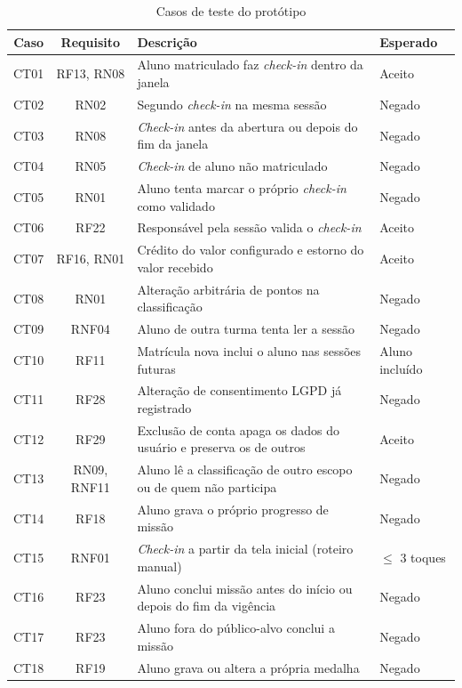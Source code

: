 \begin{table}[H]
  \centering
  \caption{Casos de teste do protótipo}
  \label{tab:testes}
  \footnotesize
  \begin{tabular}{ccp{6.0cm}p{3.2cm}}
    \toprule
    \textbf{Caso} & \textbf{Requisito} & \textbf{Descrição} & \textbf{Esperado} \\
    \midrule
    CT01 & RF13, RN08 & Aluno matriculado faz \textit{check-in} dentro da janela & Aceito \\
    CT02 & RN02 & Segundo \textit{check-in} na mesma sessão & Negado \\
    CT03 & RN08 & \textit{Check-in} antes da abertura ou depois do fim da janela & Negado \\
    CT04 & RN05 & \textit{Check-in} de aluno não matriculado & Negado \\
    CT05 & RN01 & Aluno tenta marcar o próprio \textit{check-in} como validado & Negado \\
    CT06 & RF22 & Responsável pela sessão valida o \textit{check-in} & Aceito \\
    CT07 & RF16, RN01 & Crédito do valor configurado e estorno do valor recebido & Aceito \\
    CT08 & RN01 & Alteração arbitrária de pontos na classificação & Negado \\
    CT09 & RNF04 & Aluno de outra turma tenta ler a sessão & Negado \\
    CT10 & RF11 & Matrícula nova inclui o aluno nas sessões futuras & Aluno incluído \\
    CT11 & RF28 & Alteração de consentimento LGPD já registrado & Negado \\
    CT12 & RF29 & Exclusão de conta apaga os dados do usuário e preserva os de outros & Aceito \\
    CT13 & RN09, RNF11 & Aluno lê a classificação de outro escopo ou de quem não participa & Negado \\
    CT14 & RF18 & Aluno grava o próprio progresso de missão & Negado \\
        CT15 & RNF01 & \textit{Check-in} a partir da tela inicial (roteiro manual) & $\leq$ 3 toques \\
    CT16 & RF23 & Aluno conclui missão antes do início ou depois do fim da vigência & Negado \\
    CT17 & RF23 & Aluno fora do público-alvo conclui a missão & Negado \\
    CT18 & RF19 & Aluno grava ou altera a própria medalha & Negado \\

\end{tabular}
\end{table}
